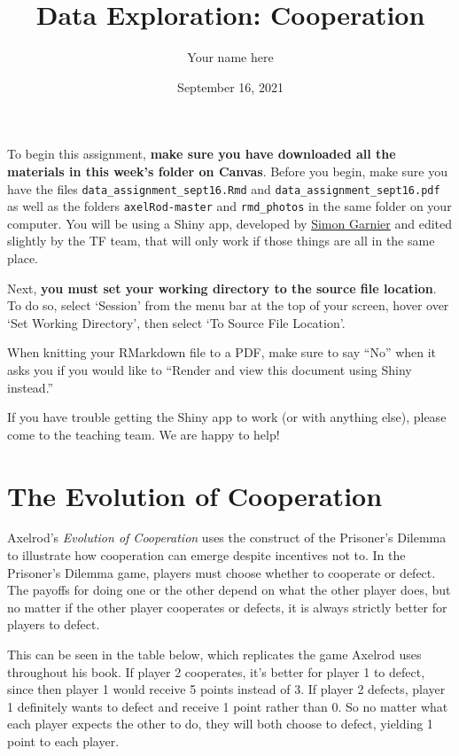 \documentclass[
]{article}
\title{Data Exploration: Cooperation}
\author{Your name here}
\date{September 16, 2021}
\begin{document}
\maketitle

To begin this assignment, \textbf{make sure you have downloaded all the
materials in this week's folder on Canvas}. Before you begin, make sure
you have the files \texttt{data\_assignment\_sept16.Rmd} and
\texttt{data\_assignment\_sept16.pdf} as well as the folders
\texttt{axelRod-master} and \texttt{rmd\_photos} in the same folder on
your computer. You will be using a Shiny app, developed by
\href{https://github.com/swarm-lab/axelRod/tree/master/R}{Simon Garnier}
and edited slightly by the TF team, that will only work if those things
are all in the same place.

Next, \textbf{you must set your working directory to the source file
location}. To do so, select `Session' from the menu bar at the top of
your screen, hover over `Set Working Directory', then select `To Source
File Location'.

When knitting your RMarkdown file to a PDF, make sure to say ``No'' when
it asks you if you would like to ``Render and view this document using
Shiny instead.''

If you have trouble getting the Shiny app to work (or with anything
else), please come to the teaching team. We are happy to help!

\hypertarget{the-evolution-of-cooperation}{%
\section{The Evolution of
Cooperation}\label{the-evolution-of-cooperation}}

Axelrod's \textit{Evolution of Cooperation} uses the construct of the
Prisoner's Dilemma to illustrate how cooperation can emerge despite
incentives not to. In the Prisoner's Dilemma game, players must choose
whether to cooperate or defect. The payoffs for doing one or the other
depend on what the other player does, but no matter if the other player
cooperates or defects, it is always strictly better for players to
defect.

This can be seen in the table below, which replicates the game Axelrod
uses throughout his book. If player 2 cooperates, it's better for player
1 to defect, since then player 1 would receive 5 points instead of 3. If
player 2 defects, player 1 definitely wants to defect and receive 1
point rather than 0. So no matter what each player expects the other to
do, they will both choose to defect, yielding 1 point to each player.
\end{document}
